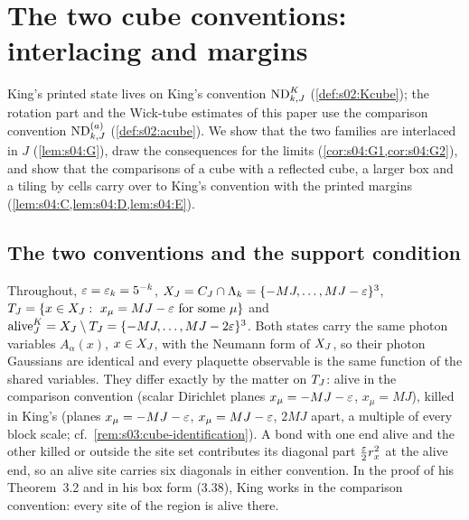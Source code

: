 \section{The two cube conventions: interlacing and margins}

King's printed state lives on King's convention $\mathrm{ND}^{K}_{k,J}$ (\cref{def:s02:Kcube}); the rotation part and the Wick-tube estimates of this paper use the comparison convention $\mathrm{ND}^{(a)}_{k,J}$ (\cref{def:s02:acube}). We show that the two families are interlaced in $J$ (\cref{lem:s04:G}), draw the consequences for the limits (\cref{cor:s04:G1,cor:s04:G2}), and show that the comparisons of a cube with a reflected cube, a larger box and a tiling by cells carry over to King's convention with the printed margins (\cref{lem:s04:C,lem:s04:D,lem:s04:E}).

\subsection{The two conventions and the support condition}

Throughout, $\varepsilon=\varepsilon_k=5^{-k}$, $X_J=C_J\cap\Lambda_k=\{-MJ,\dots,MJ-\varepsilon\}^3$, $T_J=\{x\in X_J:\ x_\mu=MJ-\varepsilon\text{ for some }\mu\}$ and $\operatorname{alive}^K_J=X_J\setminus T_J=\{-MJ,\dots,MJ-2\varepsilon\}^3$. Both states carry the same photon variables $A_\alpha(x)$, $x\in X_J$, with the Neumann form of $X_J$, so their photon Gaussians are identical and every plaquette observable is the same function of the shared variables. They differ exactly by the matter on $T_J$: alive in the comparison convention (scalar Dirichlet planes $x_\mu=-MJ-\varepsilon$, $x_\mu=MJ$), killed in King's (planes $x_\mu=-MJ-\varepsilon$, $x_\mu=MJ-\varepsilon$, $2MJ$ apart, a multiple of every block scale; cf.\ \cref{rem:s03:cube-identification}). A bond with one end alive and the other killed or outside the site set contributes its diagonal part $\frac{\varepsilon}2r_x^2$ at the alive end, so an alive site carries six diagonals in either convention. In the proof of his Theorem~3.2 and in his box form (3.38), King \cite{K2} works in the comparison convention: every site of the region is alive there.

